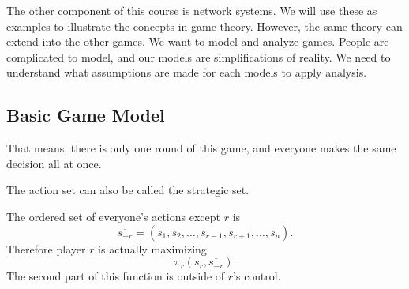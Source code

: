 The other component of this course is network systems.
We will use these as examples to illustrate the concepts in game theory. However, the same theory can extend into the other games.
We want to model and analyze games. People are complicated to model, and our models are simplifications of reality. We need to understand what assumptions are made for each models to apply analysis. 

\subsection*{Basic Game Model}
That means, there is only one round of this game, and everyone makes the same decision all at once.
\begin{remark}
    The action set can also be called the strategic set.
\end{remark}
\begin{notation}
    The ordered set of everyone's actions except $r$ is \[
        \overline{s_{-r}}=(s_1,s_2,\ldots, s_{r-1},s_{r+1},\ldots,s_n).
    \]
    Therefore player $r$ is actually maximizing \[
    \pi_r(s_r,\overline{s_{-r}}).
    \]
    The second part of this function is outside of $r$'s control.
\end{notation}

